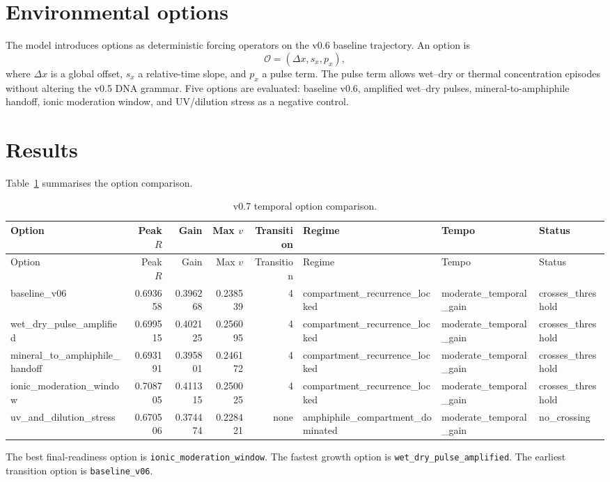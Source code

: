 \documentclass[11pt]{article}
\begin{document}
\section{Environmental options}
The model introduces options as deterministic forcing operators on the v0.6 baseline trajectory.  An option is
\[
\mathcal{O}=(\Delta x, s_x, p_x),
\]
where $\Delta x$ is a global offset, $s_x$ a relative-time slope, and $p_x$ a pulse term.  The pulse term allows wet--dry or thermal concentration episodes without altering the v0.5 DNA grammar.  Five options are evaluated: baseline v0.6, amplified wet--dry pulses, mineral-to-amphiphile handoff, ionic moderation window, and UV/dilution stress as a negative control.

\section{Results}
Table~\ref{tab:options} summarises the option comparison.

\begin{longtable}{lrrrrlll}
\caption{v0.7 temporal option comparison.}\label{tab:options}\\
\toprule
Option & Peak $R$ & Gain & Max $v$ & Transition & Regime & Tempo & Status \\
\midrule
\endfirsthead
\toprule
Option & Peak $R$ & Gain & Max $v$ & Transition & Regime & Tempo & Status \\
\midrule
\endhead
baseline\_v06 & 0.693658 & 0.396268 & 0.238539 & 4 & compartment\_recurrence\_locked & moderate\_temporal\_gain & crosses\_threshold \\
wet\_dry\_pulse\_amplified & 0.699515 & 0.402125 & 0.256095 & 4 & compartment\_recurrence\_locked & moderate\_temporal\_gain & crosses\_threshold \\
mineral\_to\_amphiphile\_handoff & 0.693191 & 0.395801 & 0.246172 & 4 & compartment\_recurrence\_locked & moderate\_temporal\_gain & crosses\_threshold \\
ionic\_moderation\_window & 0.708705 & 0.411315 & 0.250025 & 4 & compartment\_recurrence\_locked & moderate\_temporal\_gain & crosses\_threshold \\
uv\_and\_dilution\_stress & 0.670506 & 0.374474 & 0.228421 & none & amphiphile\_compartment\_dominated & moderate\_temporal\_gain & no\_crossing \\
\bottomrule
\end{longtable}

The best final-readiness option is \texttt{ionic\_moderation\_window}.  The fastest growth option is \texttt{wet\_dry\_pulse\_amplified}.  The earliest transition option is \texttt{baseline\_v06}.
\end{document}
